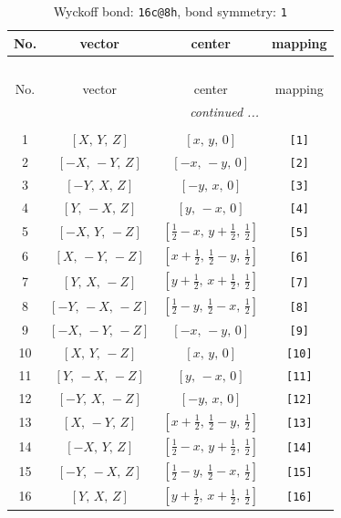 \documentclass[fleqn,8pt]{jsarticle}
\begin{document}
\begin{longtable}{cccc}
\caption{Wyckoff bond: {\tt 16c@8h}, bond symmetry: {\tt 1}}
 \\
 \hline \hline
No. & vector & center & mapping \\ \hline \endfirsthead

\multicolumn{3}{l}{\tablename\ \thetable{}} \\
 \hline \hline
No. & vector & center & mapping \\ \hline \endhead

 \hline \hline
\multicolumn{3}{r}{\footnotesize\it continued ...} \\ \endfoot

 \hline \hline
\multicolumn{3}{r}{} \\ \endlastfoot

1 & $\left[ X,\, Y,\, Z \right]$ & $\left[ x,\, y,\, 0 \right]$ & {\tt [1]} \\ \hline
2 & $\left[ - X,\, - Y,\, Z \right]$ & $\left[ - x,\, - y,\, 0 \right]$ & {\tt [2]} \\ \hline
3 & $\left[ - Y,\, X,\, Z \right]$ & $\left[ - y,\, x,\, 0 \right]$ & {\tt [3]} \\ \hline
4 & $\left[ Y,\, - X,\, Z \right]$ & $\left[ y,\, - x,\, 0 \right]$ & {\tt [4]} \\ \hline
5 & $\left[ - X,\, Y,\, - Z \right]$ & $\left[ \frac{1}{2} - x,\, y + \frac{1}{2},\, \frac{1}{2} \right]$ & {\tt [5]} \\ \hline
6 & $\left[ X,\, - Y,\, - Z \right]$ & $\left[ x + \frac{1}{2},\, \frac{1}{2} - y,\, \frac{1}{2} \right]$ & {\tt [6]} \\ \hline
7 & $\left[ Y,\, X,\, - Z \right]$ & $\left[ y + \frac{1}{2},\, x + \frac{1}{2},\, \frac{1}{2} \right]$ & {\tt [7]} \\ \hline
8 & $\left[ - Y,\, - X,\, - Z \right]$ & $\left[ \frac{1}{2} - y,\, \frac{1}{2} - x,\, \frac{1}{2} \right]$ & {\tt [8]} \\ \hline
9 & $\left[ - X,\, - Y,\, - Z \right]$ & $\left[ - x,\, - y,\, 0 \right]$ & {\tt [9]} \\ \hline
10 & $\left[ X,\, Y,\, - Z \right]$ & $\left[ x,\, y,\, 0 \right]$ & {\tt [10]} \\ \hline
11 & $\left[ Y,\, - X,\, - Z \right]$ & $\left[ y,\, - x,\, 0 \right]$ & {\tt [11]} \\ \hline
12 & $\left[ - Y,\, X,\, - Z \right]$ & $\left[ - y,\, x,\, 0 \right]$ & {\tt [12]} \\ \hline
13 & $\left[ X,\, - Y,\, Z \right]$ & $\left[ x + \frac{1}{2},\, \frac{1}{2} - y,\, \frac{1}{2} \right]$ & {\tt [13]} \\ \hline
14 & $\left[ - X,\, Y,\, Z \right]$ & $\left[ \frac{1}{2} - x,\, y + \frac{1}{2},\, \frac{1}{2} \right]$ & {\tt [14]} \\ \hline
15 & $\left[ - Y,\, - X,\, Z \right]$ & $\left[ \frac{1}{2} - y,\, \frac{1}{2} - x,\, \frac{1}{2} \right]$ & {\tt [15]} \\ \hline
16 & $\left[ Y,\, X,\, Z \right]$ & $\left[ y + \frac{1}{2},\, x + \frac{1}{2},\, \frac{1}{2} \right]$ & {\tt [16]} \\
\end{longtable}
\end{document}
